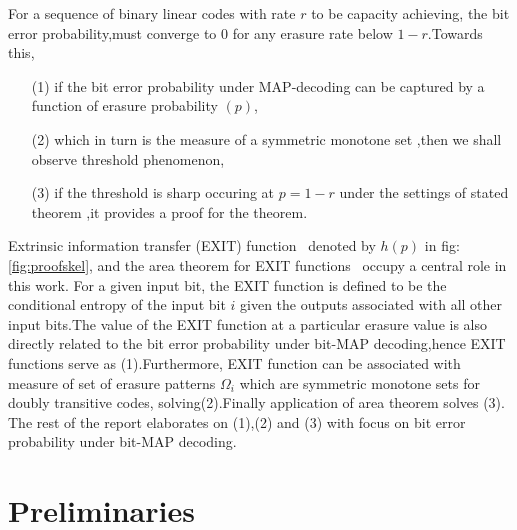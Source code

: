 \documentclass[
10pt, %
a4paper, %
oneside, %
headinclude,footinclude, %
BCOR5mm, %
]{scrartcl}
\begin{document}
For a sequence of binary linear codes with rate $r$ to be capacity achieving, the bit error probability,must converge to $0$ for any erasure rate below $1-r$.Towards this, 
\begin{enumerate}
\item[(1)]if the bit error probability under MAP-decoding can be captured by a function of erasure probability $(p)$,
\item[(2)]which in turn is the measure of a symmetric monotone set ,then we shall observe threshold phenomenon,
\item[(3)] if the threshold is sharp occuring at $p=1-r$ under the settings of stated theorem ,it provides a proof for the theorem.
\end{enumerate}
Extrinsic information transfer (EXIT) function~\cite{exit} denoted by $h(p)$ in fig:\ref{fig:proofskel}, and the area theorem for EXIT functions~\cite{areathm} occupy a central role in this work. For a given input bit, the EXIT function is defined to be the conditional entropy of the input bit $i$ given the outputs associated with all other input bits.The value of the EXIT function at a particular erasure value is also directly related to the bit error probability under bit-MAP decoding,hence EXIT functions serve as (1).Furthermore, EXIT function can be associated with measure of set of erasure patterns $\Omega_i$ which are symmetric monotone sets for doubly transitive codes, solving(2).Finally application of area theorem solves (3).
The rest of the report elaborates on (1),(2) and (3) with focus on bit error probability under bit-MAP decoding.


\section{Preliminaries}
\end{document}

